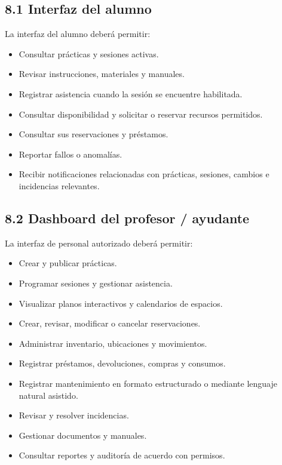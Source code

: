 \documentclass[12pt]{article}
\begin{document}
\subsection*{8.1 Interfaz del alumno}

La interfaz del alumno deberá permitir:

\begin{itemize}[leftmargin=1.2cm]
    \item Consultar prácticas y sesiones activas.
    \item Revisar instrucciones, materiales y manuales.
    \item Registrar asistencia cuando la sesión se encuentre habilitada.
    \item Consultar disponibilidad y solicitar o reservar recursos permitidos.
    \item Consultar sus reservaciones y préstamos.
    \item Reportar fallos o anomalías.
    \item Recibir notificaciones relacionadas con prácticas, sesiones, cambios e incidencias relevantes.
\end{itemize}

\subsection*{8.2 Dashboard del profesor / ayudante}

La interfaz de personal autorizado deberá permitir:

\begin{itemize}[leftmargin=1.2cm]
    \item Crear y publicar prácticas.
    \item Programar sesiones y gestionar asistencia.
    \item Visualizar planos interactivos y calendarios de espacios.
    \item Crear, revisar, modificar o cancelar reservaciones.
    \item Administrar inventario, ubicaciones y movimientos.
    \item Registrar préstamos, devoluciones, compras y consumos.
    \item Registrar mantenimiento en formato estructurado o mediante lenguaje natural asistido.
    \item Revisar y resolver incidencias.
    \item Gestionar documentos y manuales.
    \item Consultar reportes y auditoría de acuerdo con permisos.
\end{itemize}
\end{document}
